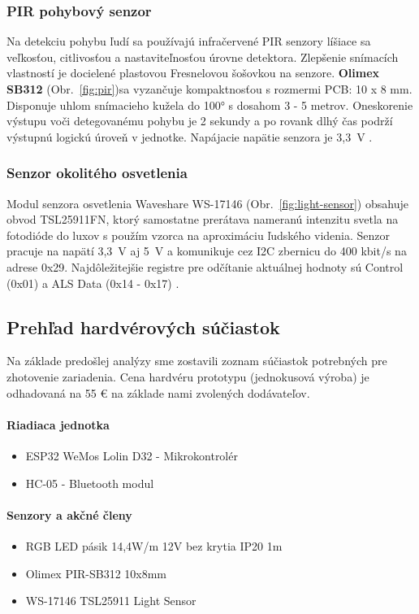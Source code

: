 \documentclass[12pt, a4paper]{article}
\begin{document}
\subsubsection{PIR pohybový senzor}
Na detekciu pohybu ľudí sa používajú infračervené PIR senzory líšiace sa veľkosťou, citlivosťou a nastaviteľnosťou úrovne detektora. Zlepšenie snímacích vlastností je docielené plastovou Fresnelovou šošovkou na senzore. \textbf{Olimex SB312} (Obr.~\ref{fig:pir})sa vyzančuje kompaktnosťou s rozmermi PCB: 10 x 8 mm. Disponuje uhlom snímacieho kužela do 100° s dosahom 3 - 5 metrov. Oneskorenie výstupu voči detegovanému pohybu je 2 sekundy a po rovank dlhý čas podrží výstupnú logickú úroveň v jednotke. Napájacie napätie senzora je 3,3~V \cite{olimex_pir-sb312_nodate}.

\subsubsection{Senzor okolitého osvetlenia}
Modul senzora osvetlenia Waveshare WS-17146 (Obr.~\ref{fig:light-sensor}) obsahuje obvod TSL25911FN, ktorý samostatne prerátava nameranú intenzitu svetla na fotodióde do luxov s použím vzorca na aproximáciu ľudského videnia. Senzor pracuje na napätí 3,3~V aj 5~V a komunikuje cez I2C zbernicu do 400 kbit/s na adrese 0x29. Najdôležitejšie registre pre odčítanie aktuálnej hodnoty sú Control (0x01) a ALS Data (0x14 - 0x17) \cite{noauthor_tsl25911_nodate}.

\subsection{Prehľad hardvérových súčiastok}
Na základe predošlej analýzy sme zostavili zoznam súčiastok potrebných pre zhotovenie zariadenia. Cena hardvéru prototypu (jednokusová výroba) je odhadovaná na 55 € na základe nami zvolených dodávateľov.

\paragraph{Riadiaca jednotka}
\begin{itemize}
\item ESP32 WeMos Lolin D32 - Mikrokontrolér
\item HC-05 - Bluetooth modul
\end{itemize}

\paragraph{Senzory a akčné členy}
\begin{itemize}
\itemsep0pt
\item RGB LED pásik 14,4W/m 12V bez krytia IP20 1m
\item Olimex PIR-SB312 10x8mm 
\item WS-17146 TSL25911 Light Sensor
\end{itemize}
\end{document}
